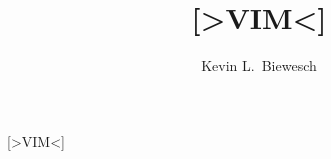 \documentclass{scrartcl}
\title{[>VIM<]}
\author{Kevin L.\ Biewesch}
\begin{document}
\maketitle

[>VIM<]
\end{document}
